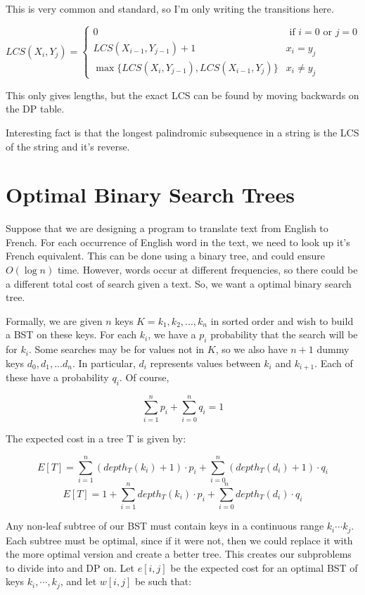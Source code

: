 \documentclass[12pt,letterpaper]{article}
\theoremstyle{definition}
\begin{document}
This is very common and standard, so I'm only writing the transitions here.

\[
  LCS(X_i,Y_j) = \begin{cases}
    0 & \text{ if } i = 0 \text{ or } j = 0 \\
    LCS(X_{i-1},Y_{j-1})+1 & x_i = y_j \\
    \max \{LCS(X_i, Y_{j-1}), LCS(X_{i-1},Y_j)\} & x_i \neq y_j
  \end{cases}
\]

This only gives lengths, but the exact LCS can be found by moving backwards on the DP table.

Interesting fact is that the longest palindromic subsequence in a string is the LCS of the string and it's reverse.

\section{Optimal Binary Search Trees}

Suppose that we are designing a program to translate text from English to French. For each occurrence of English word in the text, we need to look up it's French equivalent. This can be done using a binary tree, and could ensure $O(\log n)$ time. However, words occur at different frequencies, so there could be a different total cost of search given a text. So, we want a optimal binary search tree.

Formally, we are given $n$ keys $K = k_1,k_2,...,k_n$ in sorted order and wish to build a BST on these keys. For each $k_i$, we have a $p_i$ probability that the search will be for $k_i$. Some searches may be for values not in $K$, so we also have $n+1$ dummy keys $d_0,d_1,...d_n$. In particular, $d_i$ represents values between $k_i$ and $k_{i+1}$. Each of these have a probability $q_i$. Of course,

\[\sum_{i=1}^n p_i + \sum_{i=0}^n q_i = 1\]

The expected cost in a tree T is given by:

\[E[T] = \sum_{i=1}^n (depth_{T}(k_i) + 1) \cdot p_i + \sum_{i=0}^n (depth_{T}(d_i) + 1)\cdot q_i \]
\[E[T] = 1 + \sum_{i=1}^n depth_{T}(k_i) \cdot p_i + \sum_{i=0}^n depth_{T}(d_i) \cdot q_i \]

Any non-leaf subtree of our BST must contain keys in a continuous range $k_i \cdots k_j$. Each subtree must be optimal, since if it were not, then we could replace it with the more optimal version and create a better tree. This creates our subproblems to divide into and DP on. Let $e[i,j]$ be the expected cost for an optimal BST of keys $k_i,\cdots,k_j$, and let $w[i,j]$ be such that:
\end{document}
